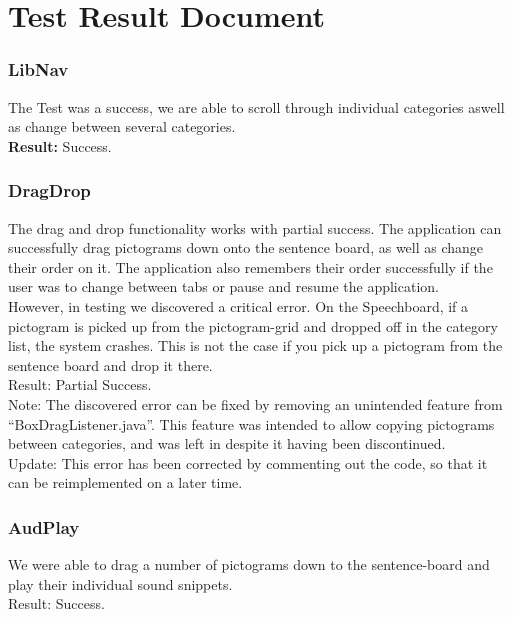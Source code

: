\section{Test Result Document}

\subsubsection*{LibNav}
The Test was a success, we are able to scroll through individual categories aswell as change between several categories.\\

\textbf{Result:} Success.

\subsubsection*{DragDrop}
The drag and drop functionality works with partial success.
The application can successfully drag pictograms down onto the sentence board, as well as change their order on it.
The application also remembers their order successfully if the user was to change between tabs or pause and resume the application.\\

However, in testing we discovered a critical error. On the Speechboard, if a pictogram is picked up from the pictogram-grid and dropped off in the category list, the system crashes.
This is not the case if you pick up a pictogram from the sentence board and drop it there.\\

Result: Partial Success.\\

Note: The discovered error can be fixed by removing an unintended feature from ``BoxDragListener.java''. This feature was intended to allow copying pictograms between categories, and was left in despite it having been discontinued. \\

Update: This error has been corrected by commenting out the code, so that it can be reimplemented on a later time.

\subsubsection*{AudPlay}
We were able to drag a number of pictograms down to the sentence-board and play their individual sound snippets.\\

Result: Success.\\

